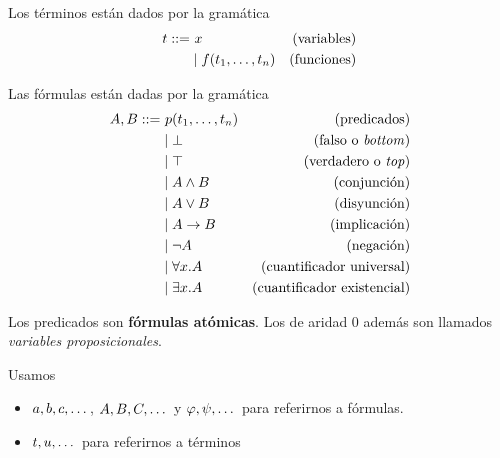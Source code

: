 \begin{definition}[Términos]
    \label{intro:def:term}
    Los términos están dados por la gramática
    \begin{align*}
        \term ::= &\ \var                               &\text{(variables)} \\
                  & \mid \fun(\term_1, \dots, \term_n) &\text{(funciones)}
    \end{align*}
\end{definition}

\begin{definition}[Fórmulas]
    Las fórmulas están dadas por la gramática
    \begin{align*}
        A, B ::=
         & \ p(t_1, \dots, t_n) & (\text{predicados})                \\
         & \mid \bot                     & \text{(falso o \textit{bottom})}         \\
         & \mid \top                      & \text{(verdadero o \textit{top})} \\
         & \mid A \wedge B        & \text{(conjunción)}                \\
         & \mid A \vee B         & \text{(disyunción)}                \\
         & \mid A \to B        & \text{(implicación)}               \\
         & \mid \neg A                 & \text{(negación)}                  \\
         & \mid \forall x . A        & \text{(cuantificador universal)}   \\
         & \mid \exists x . A        & \text{(cuantificador existencial)}
    \end{align*}

    Los predicados son \textbf{fórmulas atómicas}. Los de aridad 0 además son llamados \textit{variables proposicionales}.
\end{definition}

\begin{notation*}
    Usamos
    \begin{itemize}
        \item $a, b, c, \dots$, $A, B, C, \dots$ y $\varphi, \psi, \dots$ para referirnos a fórmulas.
        \item $t, u, \dots$ para referirnos a términos
    \end{itemize}
\end{notation*}

